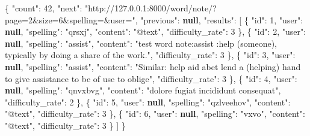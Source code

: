 \documentclass[
]{article}
\newenvironment{Shaded}{}{}
\newcommand{\DataTypeTok}[1]{\textcolor[rgb]{0.56,0.13,0.00}{#1}}
\newcommand{\DecValTok}[1]{\textcolor[rgb]{0.25,0.63,0.44}{#1}}
\newcommand{\FunctionTok}[1]{\textcolor[rgb]{0.02,0.16,0.49}{#1}}
\newcommand{\KeywordTok}[1]{\textcolor[rgb]{0.00,0.44,0.13}{\textbf{#1}}}
\newcommand{\OtherTok}[1]{\textcolor[rgb]{0.00,0.44,0.13}{#1}}
\newcommand{\StringTok}[1]{\textcolor[rgb]{0.25,0.44,0.63}{#1}}
\begin{document}
\begin{Shaded}
\begin{Highlighting}[]
\FunctionTok{\{}
  \DataTypeTok{"count"}\FunctionTok{:} \DecValTok{42}\FunctionTok{,}
  \DataTypeTok{"next"}\FunctionTok{:} \StringTok{"http://127.0.0.1:8000/word/note/?page=2\&size=6\&spelling=\&user="}\FunctionTok{,}
  \DataTypeTok{"previous"}\FunctionTok{:} \KeywordTok{null}\FunctionTok{,}
  \DataTypeTok{"results"}\FunctionTok{:} \OtherTok{[}
    \FunctionTok{\{}
      \DataTypeTok{"id"}\FunctionTok{:} \DecValTok{1}\FunctionTok{,}
      \DataTypeTok{"user"}\FunctionTok{:} \KeywordTok{null}\FunctionTok{,}
      \DataTypeTok{"spelling"}\FunctionTok{:} \StringTok{"qrsxj"}\FunctionTok{,}
      \DataTypeTok{"content"}\FunctionTok{:} \StringTok{"@text"}\FunctionTok{,}
      \DataTypeTok{"difficulty\_rate"}\FunctionTok{:} \DecValTok{3}
    \FunctionTok{\}}\OtherTok{,}
    \FunctionTok{\{}
      \DataTypeTok{"id"}\FunctionTok{:} \DecValTok{2}\FunctionTok{,}
      \DataTypeTok{"user"}\FunctionTok{:} \KeywordTok{null}\FunctionTok{,}
      \DataTypeTok{"spelling"}\FunctionTok{:} \StringTok{"assist"}\FunctionTok{,}
      \DataTypeTok{"content"}\FunctionTok{:} \StringTok{"test word note:assist :help (someone), typically by doing a share of the work."}\FunctionTok{,}
      \DataTypeTok{"difficulty\_rate"}\FunctionTok{:} \DecValTok{3}
    \FunctionTok{\}}\OtherTok{,}
    \FunctionTok{\{}
      \DataTypeTok{"id"}\FunctionTok{:} \DecValTok{3}\FunctionTok{,}
      \DataTypeTok{"user"}\FunctionTok{:} \KeywordTok{null}\FunctionTok{,}
      \DataTypeTok{"spelling"}\FunctionTok{:} \StringTok{"assist"}\FunctionTok{,}
      \DataTypeTok{"content"}\FunctionTok{:} \StringTok{"Similar: help aid abet lend a (helping) hand to give assistance to be of use to oblige"}\FunctionTok{,}
      \DataTypeTok{"difficulty\_rate"}\FunctionTok{:} \DecValTok{3}
    \FunctionTok{\}}\OtherTok{,}
    \FunctionTok{\{}
      \DataTypeTok{"id"}\FunctionTok{:} \DecValTok{4}\FunctionTok{,}
      \DataTypeTok{"user"}\FunctionTok{:} \KeywordTok{null}\FunctionTok{,}
      \DataTypeTok{"spelling"}\FunctionTok{:} \StringTok{"qnvxbvg"}\FunctionTok{,}
      \DataTypeTok{"content"}\FunctionTok{:} \StringTok{"dolore fugiat incididunt consequat"}\FunctionTok{,}
      \DataTypeTok{"difficulty\_rate"}\FunctionTok{:} \DecValTok{2}
    \FunctionTok{\}}\OtherTok{,}
    \FunctionTok{\{}
      \DataTypeTok{"id"}\FunctionTok{:} \DecValTok{5}\FunctionTok{,}
      \DataTypeTok{"user"}\FunctionTok{:} \KeywordTok{null}\FunctionTok{,}
      \DataTypeTok{"spelling"}\FunctionTok{:} \StringTok{"qzlveehov"}\FunctionTok{,}
      \DataTypeTok{"content"}\FunctionTok{:} \StringTok{"@text"}\FunctionTok{,}
      \DataTypeTok{"difficulty\_rate"}\FunctionTok{:} \DecValTok{3}
    \FunctionTok{\}}\OtherTok{,}
    \FunctionTok{\{}
      \DataTypeTok{"id"}\FunctionTok{:} \DecValTok{6}\FunctionTok{,}
      \DataTypeTok{"user"}\FunctionTok{:} \KeywordTok{null}\FunctionTok{,}
      \DataTypeTok{"spelling"}\FunctionTok{:} \StringTok{"vxvo"}\FunctionTok{,}
      \DataTypeTok{"content"}\FunctionTok{:} \StringTok{"@text"}\FunctionTok{,}
      \DataTypeTok{"difficulty\_rate"}\FunctionTok{:} \DecValTok{3}
    \FunctionTok{\}}
  \OtherTok{]}
\FunctionTok{\}}
\end{Highlighting}
\end{Shaded}
\end{document}
